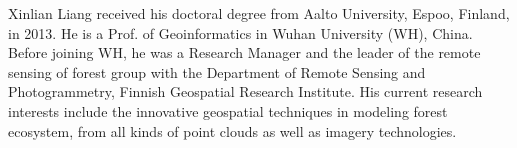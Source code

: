 \documentclass[lettersize,journal]{IEEEtran}
\begin{document}
\begin{IEEEbiography}{Xinlian Liang}
 received his doctoral degree from Aalto University, Espoo, Finland, in 2013. He is a Prof. of Geoinformatics in Wuhan University (WH), China. Before joining WH, he was a Research Manager and the leader of the remote sensing of forest group with the Department of Remote Sensing and Photogrammetry, Finnish Geospatial Research Institute. His current research interests include the innovative geospatial techniques in modeling forest ecosystem, from all kinds of point clouds as well as imagery technologies.
\end{IEEEbiography}

\newpage








% 
\end{document}
